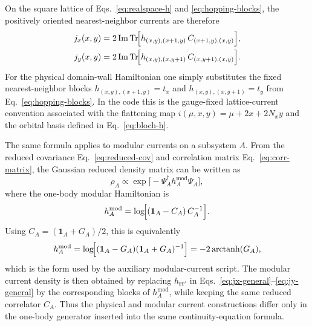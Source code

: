 \documentclass[aps,prb,onecolumn,nofootinbib]{revtex4-2}
\newcommand{\Id}{\mathbf{1}}
\begin{document}
On the square lattice of Eqs.~\eqref{eq:realspace-h} and
\eqref{eq:hopping-blocks}, the positively oriented nearest-neighbor currents are
therefore
\begin{align}
j_x(x,y)
&=
2\,\mathrm{Im}\,
\mathrm{Tr}\!\Bigl[
h_{(x,y),(x+1,y)}\,
C_{(x+1,y),(x,y)}
\Bigr],
\label{eq:jx-general}
\\
j_y(x,y)
&=
2\,\mathrm{Im}\,
\mathrm{Tr}\!\Bigl[
h_{(x,y),(x,y+1)}\,
C_{(x,y+1),(x,y)}
\Bigr].
\label{eq:jy-general}
\end{align}
For the physical domain-wall Hamiltonian one simply substitutes the fixed
nearest-neighbor blocks $h_{(x,y),(x+1,y)}=t_x$ and
$h_{(x,y),(x,y+1)}=t_y$ from Eq.~\eqref{eq:hopping-blocks}.  In the code this
is the gauge-fixed lattice-current convention associated with the flattening map
$i(\mu,x,y)=\mu+2x+2N_xy$ and the orbital basis defined in
Eq.~\eqref{eq:bloch-h}.

The same formula applies to modular currents on a subsystem $A$.  From the
reduced covariance Eq.~\eqref{eq:reduced-cov} and correlation matrix
Eq.~\eqref{eq:corr-matrix}, the Gaussian reduced density matrix can be written
as
\begin{equation}
\rho_A \propto \exp\!\bigl[-\Psi_A^\dagger h_A^{\mathrm{mod}}\Psi_A\bigr],
\end{equation}
where the one-body modular Hamiltonian is
\begin{equation}
h_A^{\mathrm{mod}}
=
\log\!\Bigl[(\Id_A-C_A)\, C_A^{-1}\Bigr].
\label{eq:modular-hamiltonian-C}
\end{equation}
Using $C_A=(\Id_A+G_A)/2$, this is equivalently
\begin{equation}
h_A^{\mathrm{mod}}
=
\log\!\Bigl[(\Id_A-G_A)(\Id_A+G_A)^{-1}\Bigr]
=
-2\,\mathrm{arctanh}(G_A),
\label{eq:modular-hamiltonian-G}
\end{equation}
which is the form used by the auxiliary modular-current script.
The modular current density is then obtained by replacing
$h_{\bm{r}\bm{r}'}$ in Eqs.~\eqref{eq:jx-general}--\eqref{eq:jy-general} by the
corresponding blocks of $h_A^{\mathrm{mod}}$, while keeping the same reduced
correlator $C_A$.  Thus the physical and modular current constructions differ
only in the one-body generator inserted into the same continuity-equation
formula.
\end{document}
